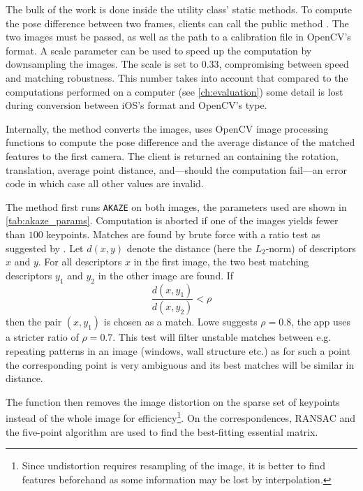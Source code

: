 The bulk of the work is done inside the utility class'  static
methods. To compute the pose difference between two frames, clients can call the
public method
.
The two images must be passed, as well as the path to a calibration file in
OpenCV's  format. A scale parameter can be used to speed up
the computation by downsampling the images.  The scale is set to $0.33$,
compromising between speed and matching robustness. This number takes into
account that compared to the computations performed on a computer (see
\autoref{ch:evaluation}) some detail is lost during conversion between iOS's
 format and OpenCV's  type.

Internally, the method converts the images, uses OpenCV image processing
functions to compute the pose difference and the average distance of the matched
features to the first camera. The client is returned an 
containing the rotation, translation, average point distance, and---should the
computation fail---an error code in which case all other values are invalid.

The method first runs \texttt{AKAZE} on both images, the parameters used are
shown in \autoref{tab:akaze_params}.  Computation is aborted if one of the
images yields fewer than $100$ keypoints.  Matches are found by brute force with
a ratio test as suggested by \citet{lowe2004}. Let $d(x,y)$ denote the distance
(here the $L_2$-norm) of descriptors $x$ and $y$. For all descriptors $x$ in the
first image, the two best matching descriptors $y_1$ and $y_2$ in the other
image are found. If
\begin{equation*}
   \frac{d(x,y_1)}{d(x,y_2)} < \rho
\end{equation*}
then the pair $(x,y_1)$ is chosen as a match. Lowe suggests $\rho=0.8$, the app
uses a stricter ratio of $\rho=0.7$. This test will filter unstable matches
between e.g. repeating patterns in an image (windows, wall structure etc.) as
for such a point the corresponding point is very ambiguous and its best matches
will be similar in distance.

The function then removes the image distortion on the sparse set of keypoints
instead of the whole image for efficiency\footnote{Since undistortion requires
   resampling of the image, it is better to find features beforehand as some
information may be lost by interpolation.}. On the correspondences, RANSAC and
the five-point algorithm are used to find the best-fitting essential matrix. 

